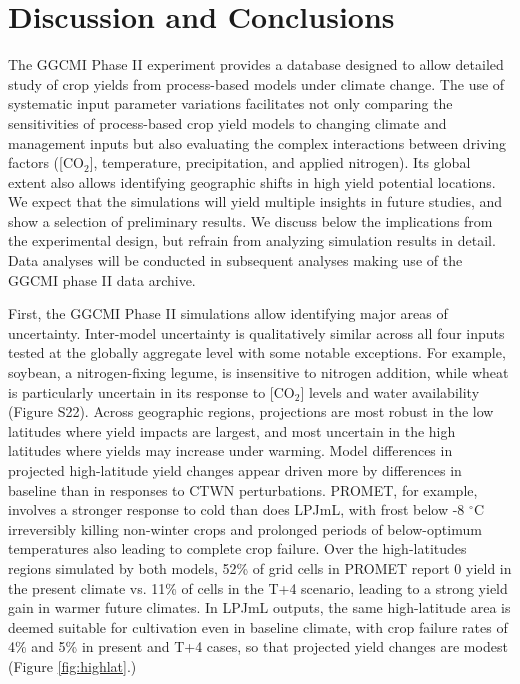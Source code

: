 \documentclass[gmd, manuscript]{copernicus} %
\begin{document}
\section{Discussion and Conclusions} 
\label{S:5}
The GGCMI Phase II experiment provides a database designed to allow detailed study of crop yields from process-based models under climate change. 
The use of systematic input parameter variations facilitates not only comparing the sensitivities of process-based crop yield models to changing climate and management inputs but also evaluating the complex interactions between driving factors ([CO$_2$], temperature, precipitation, and applied nitrogen). 
Its global extent also allows identifying geographic shifts in high yield potential locations. 
We expect that the simulations will yield multiple insights in future studies, and show a selection of preliminary results. 
We discuss below the implications from the experimental design, but refrain from analyzing simulation results in detail. 
Data analyses will be conducted in subsequent analyses making use of the GGCMI phase II data archive.

First, the GGCMI Phase II simulations allow identifying major areas of uncertainty. 
Inter-model uncertainty is qualitatively similar across all four inputs tested at the globally aggregate level with some notable exceptions. 
For example, soybean, a nitrogen-fixing legume, is insensitive to nitrogen addition, while wheat is particularly uncertain in its response to [CO$_2$] levels and water availability (Figure S22). 
Across geographic regions, projections are most robust in the low latitudes where yield impacts are largest, and most uncertain in the high latitudes where yields may increase under warming. 
Model differences in projected high-latitude yield changes appear driven more by differences in baseline than in responses to CTWN perturbations.  
PROMET, for example, involves a stronger response to cold than does LPJmL, with frost below -8 $^\circ$C irreversibly killing non-winter crops and prolonged periods of below-optimum temperatures also leading to complete crop failure. 
Over the high-latitudes regions simulated by both models, 52\% of grid cells in PROMET report 0 yield in the present climate vs. 11\% of cells in the T+4 scenario, leading to a strong yield gain in warmer future climates. 
In LPJmL outputs, the same high-latitude area is deemed suitable for cultivation even in baseline climate, with crop failure rates of 4\% and 5\% in present and T+4 cases, so that projected yield changes are modest (Figure \ref{fig:highlat}.)
\end{document}
